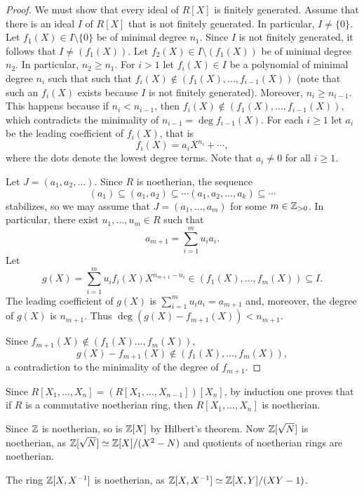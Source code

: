 \begin{proof}
	We must show that every ideal of $R[X]$ is finitely generated. Assume that
	there is an ideal $I$ of $R[X]$ that is not finitely generated. In particular, $I\ne\{0\}$. 
	Let $f_1(X)\in I\setminus\{0\}$ be of minimal degree $n_1$. 
	Since $I$ is not finitely generated, it follows that 
	$I\ne (f_1(X))$. Let $f_2(X)\in I\setminus (f_1(X))$ be
	of minimal degree $n_2$. In particular, $n_2\geq n_1$. 
	For $i>1$ let 
	$f_i(X)\in I$ be a polynomial of minimal degree $n_i$ such that  
	such that $f_i(X)\not\in(f_1(X),\dots,f_{i-1}(X))$ (note
	that such an $f_i(X)$ exists because $I$ is not finitely generated). 
	Moreover, $n_i\geq n_{i-1}$. This happens because 
	if $n_i<n_{i-1}$, then
	$f_i(X)\not\in (f_1(X),\dots,f_{i-1}(X))$, which contradicts
	the minimality of $n_{i-1}=\deg f_{i-1}(X)$. 
	For each $i\geq1$ 
	let $a_i$ be the leading coefficient of $f_i(X)$, that is
	\[
	f_i(X)=a_iX^{n_i}+\cdots,
	\]
	where the dots denote the lowest degree terms. Note that 
	$a_i\ne 0$ for all $i\geq 1$. 
	
	Let $J=(a_1,a_2,\dots)$. Since $R$ is noetherian, the sequence
	\[
	(a_1)\subseteq (a_1,a_2)\subseteq\cdots(a_1,a_2,\dots,a_k)\subseteq\cdots
	\]
	stabilizes, so we may assume that 
	$J=(a_1,\dots,a_m)$ for some $m\in\mathbb{Z}_{>0}$. 
	In particular, there exist $u_1,\dots,u_m\in R$ such that 
	\[
	a_{m+1}=\sum_{i=1}^m u_ia_i.
	\]
	Let 
	\[
	g(X)=\sum_{i=1}^mu_if_i(X)X^{n_{m+1}-n_i}\in (f_1(X),\dots,f_m(X))\subseteq I.
	\]
	The leading coefficient of $g(X)$ is $\sum_{i=1}^mu_ia_i=a_{m+1}$ and, moreover, 
	the degree of $g(X)$ is $n_{m+1}$. Thus $\deg(g(X)-f_{m+1}(X))<n_{m+1}$. 
	
	Since $f_{m+1}(X)\not\in (f_1(X)\dots,f_m(X))$, 
	\[
	g(X)-f_{m+1}(X)\not\in (f_1(X),\dots,f_m(X)),
	\]
	a contradiction to the minimality of the degree of $f_{m+1}$.  
\end{proof}

Since $R[X_1,\dots,X_n]=(R[X_1,\dots,X_{n-1}])[X_n]$, by induction 
one proves that if $R$ is a commutative noetherian ring, 
then $R[X_1,\dots,X_n]$ is noetherian. 
 
\begin{example}
	Since $\mathbb{Z}$ is noetherian, so is $\mathbb{Z}[X]$ by Hilbert's theorem. Now 
	$\mathbb{Z}[\sqrt{N}]$ is noetherian, as $\mathbb{Z}[\sqrt{N}]\simeq\mathbb{Z}[X]/(X^2-N)$ and quotients
	of noetherian rings are noetherian.  	
\end{example}

\begin{example}
	The ring $\mathbb{Z}[X,X^{-1}]$ is noetherian, as $\mathbb{Z}[X,X^{-1}]\simeq\mathbb{Z}[X,Y]/(XY-1)$. 
\end{example}
 

